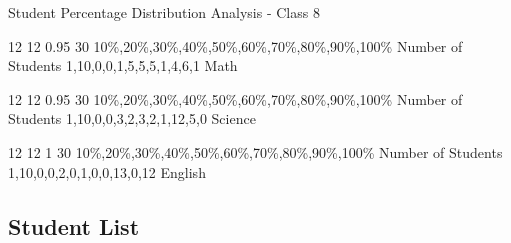 \label{1.3.2 C8 Student Distribution Analysis}
    \renewcommand{\insertclass}{ - Class 8}

    \renewcommand{\insertsubject}{Math \& Science \& English}


    \begin{frame}{Student Percentage Distribution Analysis - Class 8}
    \begin{minipage}{0.285\paperwidth}
    \studentDistribution
        {12}
        {12}
        {0.95}
        {30}
        {10\%,20\%,30\%,40\%,50\%,60\%,70\%,80\%,90\%,100\%}
        {Number of Students}
        {}
        {{1},{10},{0,0,1,5,5,5,1,4,6,1}}
        {Math}
    \end{minipage}
    \begin{minipage}{0.285\paperwidth}
    \studentDistribution
        {12}
        {12}
        {0.95}
        {30}
        {10\%,20\%,30\%,40\%,50\%,60\%,70\%,80\%,90\%,100\%}
        {Number of Students}
        {}
        {{1},{10},{0,0,3,2,3,2,1,12,5,0}}
        {Science}
    \end{minipage}
    \begin{minipage}{0.285\paperwidth}
    \studentDistributionwithoutline
        {12}
        {12}
        {1}
        {30}
        {10\%,20\%,30\%,40\%,50\%,60\%,70\%,80\%,90\%,100\%}
        {Number of Students}
        {}
        {{1},{10},{0,0,2,0,1,0,0,13,0,12}}
        {English}
    \end{minipage}
    
    \end{frame}



\subsection{Student List}


